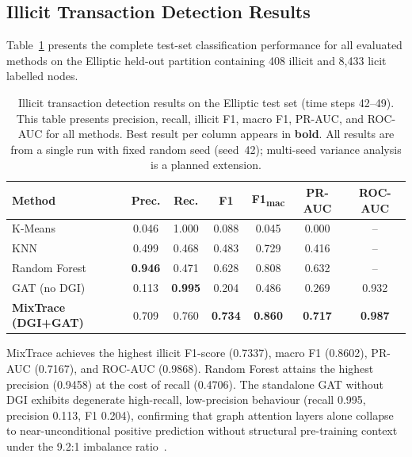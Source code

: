 \documentclass[12pt,a4paper]{article}
\begin{document}
\subsection{Illicit Transaction Detection Results}
\label{sec:class_results}

Table~\ref{tab:classification} presents the complete
test-set classification performance for all evaluated
methods on the Elliptic held-out partition containing
408 illicit and 8,433 licit labelled nodes.

\begin{table}[htbp]
  \caption{Illicit transaction detection results on the
    Elliptic test set (time steps 42--49). This table presents
    precision, recall, illicit F1, macro F1, PR-AUC, and
    ROC-AUC for all methods. Best result per column appears
    in \textbf{bold}. All results are from a single run
    with fixed random seed (seed~42); multi-seed variance
    analysis is a planned extension.}
  \label{tab:classification}
  \centering
  \small
  \setlength{\tabcolsep}{5pt}
  \begin{tabular}{lcccccc}
    \toprule
    \textbf{Method}
      & \textbf{Prec.} & \textbf{Rec.}
      & \textbf{F1} & \textbf{F1\textsubscript{mac}}
      & \textbf{PR-AUC} & \textbf{ROC-AUC} \\
    \midrule
    K-Means
      & 0.046 & 1.000 & 0.088 & 0.045 & 0.000 & -- \\
    KNN
      & 0.499 & 0.468 & 0.483 & 0.729 & 0.416 & -- \\
    Random Forest
      & \textbf{0.946} & 0.471 & 0.628 & 0.808 & 0.632 & -- \\
    GAT (no DGI)
      & 0.113 & \textbf{0.995} & 0.204 & 0.486 & 0.269 & 0.932 \\
    \textbf{MixTrace (DGI+GAT)}
      & 0.709 & 0.760 & \textbf{0.734} & \textbf{0.860}
      & \textbf{0.717} & \textbf{0.987} \\
    \bottomrule
  \end{tabular}
\end{table}

MixTrace achieves the highest illicit F1-score (0.7337),
macro F1 (0.8602), PR-AUC (0.7167), and ROC-AUC (0.9868).
Random Forest attains the highest precision (0.9458) at the
cost of recall (0.4706). The standalone GAT without DGI
exhibits degenerate high-recall, low-precision behaviour
(recall 0.995, precision 0.113, F1 0.204), confirming that
graph attention layers alone collapse to near-unconditional
positive prediction without structural pre-training context
under the 9.2:1 imbalance ratio~\citep{alarab2024}.
\end{document}
